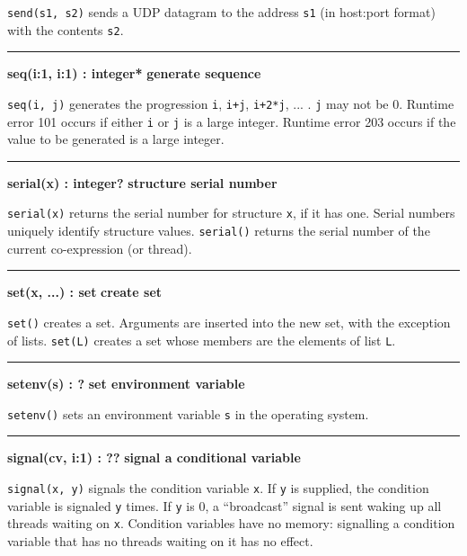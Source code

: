 \noindent
{}\texttt{send(s1, s2)} sends a UDP datagram to the
address \texttt{s1} (in host:port format) with the contents
\texttt{s2}.

\bigskip\hrule\vspace{0.1cm}
\noindent
{\bf seq(i:1, i:1) : integer* } \hfill {\bf generate sequence}

\noindent
{}\texttt{seq(i, j)} generates the
progression \texttt{i}, \texttt{i+j}, \texttt{i+2*j}, ... .
\texttt{j} may not be 0.  Runtime error 101 occurs if either
\texttt{i} or \texttt{j} is a large integer.  Runtime error 203
occurs if the value to be generated is a large integer.

\bigskip\hrule\vspace{0.1cm}
\noindent
{\bf serial(x) : integer? } \hfill {\bf structure serial number}

\noindent
{}\texttt{serial(x)} returns the serial number for
structure \texttt{x}, if it has one. Serial numbers uniquely identify
structure values. \texttt{serial()} returns the serial number of the
current co-expression (or thread).

\bigskip\hrule\vspace{0.1cm}
\noindent
{\bf set(x, ...) : set } \hfill {\bf create set}

\noindent
{}\texttt{set()} creates a set. Arguments
are inserted into the new set, with the exception of lists.
\texttt{set(L)} creates a set whose members are the elements of list
\texttt{L}.

\bigskip\hrule\vspace{0.1cm}
\noindent
{\bf setenv(s) : ? } \hfill {\bf set environment variable}

\noindent
{}\texttt{setenv()} sets an environment variable
\texttt{s} in the operating system.

\bigskip\hrule\vspace{0.1cm}
\noindent
{\bf signal(cv, i:1) : ?? } \hfill {\bf signal a conditional variable}

\noindent
{}\texttt{signal(x, y)} signals the condition variable
\texttt{x}. If \texttt{y} is supplied, the condition variable is
signaled \texttt{y} times. If \texttt{y} is 0, a ``broadcast''
signal is sent waking up all threads waiting on \texttt{x}.
Condition variables have no memory: signalling a condition variable
that has no threads waiting on it has no effect.

